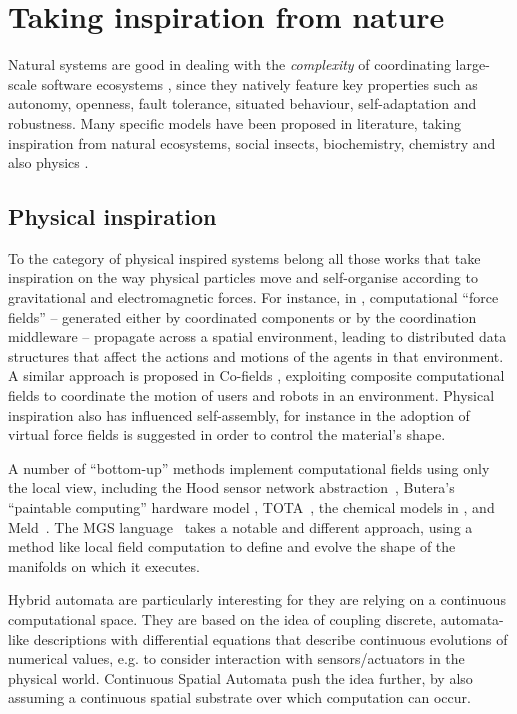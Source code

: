 \documentclass[12pt,a4paper,twoside,openright]{book}
\begin{document}
\section{Taking inspiration from nature}

Natural systems are good in dealing with the \emph{complexity} of coordinating large-scale software ecosystems \cite{nic-ieeeis19,facets,nic-cacm49}, since they natively feature key properties such as autonomy, openness, fault tolerance, situated behaviour, self-adaptation and robustness.
%
Many specific models have been proposed in literature, taking inspiration from natural ecosystems, social insects, biochemistry, chemistry and also physics \cite{ecosystems-jpcc7}.

\subsection{Physical inspiration}

To the category of physical inspired systems belong all those works that take inspiration on the way physical particles move and self-organise according to gravitational and electromagnetic forces.
%
For instance, in \cite{fieldbasedcoordination-mamei06}, computational ``force fields'' -- generated either by coordinated components or by the coordination middleware -- propagate across a spatial environment, leading to distributed data structures that affect the actions and motions of the agents in that environment.
%
A similar approach is proposed in Co-fields \cite{cofields--esawIII}, exploiting composite computational fields to coordinate the motion of users and robots in an environment.
%
Physical inspiration also has influenced self-assembly, for instance in \cite{guo2012} the adoption of virtual force fields is suggested in order to control the material's shape.

A number of ``bottom-up'' methods implement computational fields using only the local view, including the Hood sensor network abstraction~\cite{hood}, Butera's ``paintable computing'' hardware model \cite{butera}, TOTA~\cite{mamei2009acm}, the chemical models in \cite{VCMZ-TAAS2011}, and Meld~\cite{Meld}.
%
The MGS language~\cite{GiavittoMGS05} takes a notable and different approach, using a method like local field computation to define and evolve the shape of the manifolds on which it executes.

Hybrid automata \cite{561342} are particularly interesting for they are relying on a continuous computational space.
%
They are based on the idea of coupling discrete, automata-like descriptions with differential equations that describe continuous evolutions of numerical values, e.g. to consider interaction with sensors/actuators in the physical world.
%
Continuous Spatial Automata \cite{maclennanCSA} push the idea further, by also assuming a continuous spatial substrate over which computation can occur.
\end{document}
